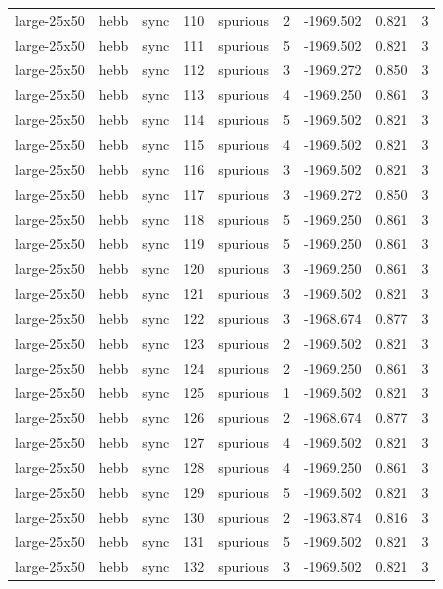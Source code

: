 \begin{tabular}{lllrlrrrr}
large-25x50 & hebb & sync & 110 & spurious & 2 & -1969.502 & 0.821 & 3 \\
large-25x50 & hebb & sync & 111 & spurious & 5 & -1969.502 & 0.821 & 3 \\
large-25x50 & hebb & sync & 112 & spurious & 3 & -1969.272 & 0.850 & 3 \\
large-25x50 & hebb & sync & 113 & spurious & 4 & -1969.250 & 0.861 & 3 \\
large-25x50 & hebb & sync & 114 & spurious & 5 & -1969.502 & 0.821 & 3 \\
large-25x50 & hebb & sync & 115 & spurious & 4 & -1969.502 & 0.821 & 3 \\
large-25x50 & hebb & sync & 116 & spurious & 3 & -1969.502 & 0.821 & 3 \\
large-25x50 & hebb & sync & 117 & spurious & 3 & -1969.272 & 0.850 & 3 \\
large-25x50 & hebb & sync & 118 & spurious & 5 & -1969.250 & 0.861 & 3 \\
large-25x50 & hebb & sync & 119 & spurious & 5 & -1969.250 & 0.861 & 3 \\
large-25x50 & hebb & sync & 120 & spurious & 3 & -1969.250 & 0.861 & 3 \\
large-25x50 & hebb & sync & 121 & spurious & 3 & -1969.502 & 0.821 & 3 \\
large-25x50 & hebb & sync & 122 & spurious & 3 & -1968.674 & 0.877 & 3 \\
large-25x50 & hebb & sync & 123 & spurious & 2 & -1969.502 & 0.821 & 3 \\
large-25x50 & hebb & sync & 124 & spurious & 2 & -1969.250 & 0.861 & 3 \\
large-25x50 & hebb & sync & 125 & spurious & 1 & -1969.502 & 0.821 & 3 \\
large-25x50 & hebb & sync & 126 & spurious & 2 & -1968.674 & 0.877 & 3 \\
large-25x50 & hebb & sync & 127 & spurious & 4 & -1969.502 & 0.821 & 3 \\
large-25x50 & hebb & sync & 128 & spurious & 4 & -1969.250 & 0.861 & 3 \\
large-25x50 & hebb & sync & 129 & spurious & 5 & -1969.502 & 0.821 & 3 \\
large-25x50 & hebb & sync & 130 & spurious & 2 & -1963.874 & 0.816 & 3 \\
large-25x50 & hebb & sync & 131 & spurious & 5 & -1969.502 & 0.821 & 3 \\
large-25x50 & hebb & sync & 132 & spurious & 3 & -1969.502 & 0.821 & 3 \\

\end{tabular}
